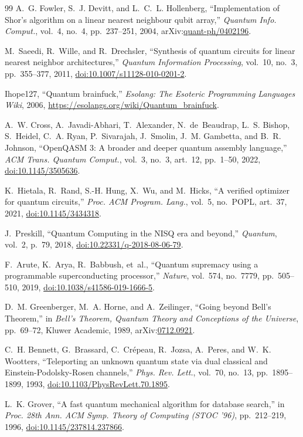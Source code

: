 \documentclass[11pt,a4paper,twocolumn]{article}
\begin{document}
\begin{thebibliography}{99}
A.~G. Fowler, S.~J. Devitt, and L.~C.~L. Hollenberg, ``Implementation of Shor's algorithm on a linear nearest neighbour qubit array,'' \emph{Quantum Info. Comput.}, vol.~4, no.~4, pp.~237--251, 2004, arXiv:\href{https://arxiv.org/abs/quant-ph/0402196}{quant-ph/0402196}.

M.~Saeedi, R.~Wille, and R.~Drechsler, ``Synthesis of quantum circuits for linear nearest neighbor architectures,'' \emph{Quantum Information Processing}, vol.~10, no.~3, pp.~355--377, 2011, \href{https://doi.org/10.1007/s11128-010-0201-2}{doi:10.1007/s11128-010-0201-2}.

Ihope127, ``Quantum brainfuck,'' \emph{Esolang: The Esoteric Programming Languages Wiki}, 2006, \href{https://esolangs.org/wiki/Quantum_brainfuck}{https://esolangs.org/wiki/Quantum\_brainfuck}.

A.~W. Cross, A.~Javadi-Abhari, T.~Alexander, N.~de~Beaudrap, L.~S. Bishop, S.~Heidel, C.~A. Ryan, P.~Sivarajah, J.~Smolin, J.~M. Gambetta, and B.~R. Johnson, ``OpenQASM 3: A broader and deeper quantum assembly language,'' \emph{ACM Trans. Quantum Comput.}, vol.~3, no.~3, art.~12, pp.~1--50, 2022, \href{https://doi.org/10.1145/3505636}{doi:10.1145/3505636}.

K.~Hietala, R.~Rand, S.-H. Hung, X.~Wu, and M.~Hicks, ``A verified optimizer for quantum circuits,'' \emph{Proc. ACM Program. Lang.}, vol.~5, no.~POPL, art.~37, 2021, \href{https://doi.org/10.1145/3434318}{doi:10.1145/3434318}.

J.~Preskill, ``Quantum Computing in the NISQ era and beyond,'' \emph{Quantum}, vol.~2, p.~79, 2018, \href{https://doi.org/10.22331/q-2018-08-06-79}{doi:10.22331/q-2018-08-06-79}.

F.~Arute, K.~Arya, R.~Babbush, et~al., ``Quantum supremacy using a programmable superconducting processor,'' \emph{Nature}, vol.~574, no.~7779, pp.~505--510, 2019, \href{https://doi.org/10.1038/s41586-019-1666-5}{doi:10.1038/s41586-019-1666-5}.

D.~M. Greenberger, M.~A. Horne, and A.~Zeilinger, ``Going beyond Bell's Theorem,'' in \emph{Bell's Theorem, Quantum Theory and Conceptions of the Universe}, pp.~69--72, Kluwer Academic, 1989, arXiv:\href{https://arxiv.org/abs/0712.0921}{0712.0921}.

C.~H. Bennett, G.~Brassard, C.~Cr{\'e}peau, R.~Jozsa, A.~Peres, and W.~K. Wootters, ``Teleporting an unknown quantum state via dual classical and Einstein-Podolsky-Rosen channels,'' \emph{Phys. Rev. Lett.}, vol.~70, no.~13, pp.~1895--1899, 1993, \href{https://doi.org/10.1103/PhysRevLett.70.1895}{doi:10.1103/PhysRevLett.70.1895}.

L.~K. Grover, ``A fast quantum mechanical algorithm for database search,'' in \emph{Proc. 28th Ann. ACM Symp. Theory of Computing (STOC '96)}, pp.~212--219, 1996, \href{https://doi.org/10.1145/237814.237866}{doi:10.1145/237814.237866}.

\end{thebibliography}
\end{document}
